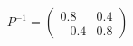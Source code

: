 \documentclass[preview]{standalone}
\begin{document}
\begin{align*}
P^{-1} = \begin{pmatrix} 0.8 & 0.4 \\ -0.4 & 0.8 \end{pmatrix}
\end{align*}
\end{document}
